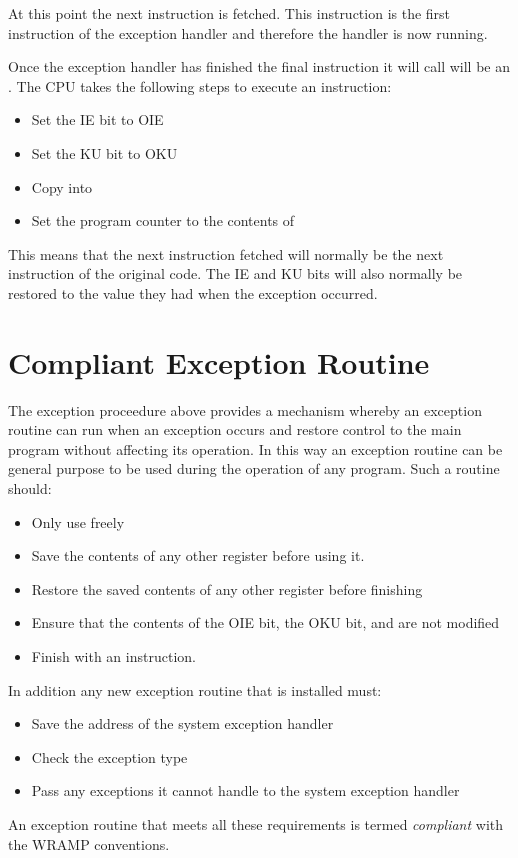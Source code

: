 At this point the next instruction is fetched. This instruction is the
first instruction of the exception handler and therefore the handler
is now running.

Once the exception handler has finished the final instruction it will
call will be an . The CPU takes the following steps to
execute an  instruction:

\begin{itemize}
\item Set the IE bit to OIE
\item Set the KU bit to OKU
\item Copy  into 
\item Set the program counter to the contents of 
\end{itemize}

This means that the next instruction fetched will normally be the
next instruction of the original code. The IE and KU bits will also
normally be restored to the value they had when the exception occurred.

\section{Compliant Exception Routine}

The exception proceedure above provides a mechanism whereby an exception routine
can run when an exception occurs and restore control to the main program without
affecting its operation.  In this way an exception routine can be general
purpose to be used during the operation of any program.  Such a routine should:

\begin{itemize}
\item Only use freely
\item Save the contents of any other register before using it.
\item Restore the saved contents of any other register before finishing
\item Ensure that the contents of the OIE bit, the OKU bit,  and
 are not modified
\item Finish with an   instruction.
\end{itemize}

In addition any new exception routine that is installed must:

\begin{itemize}
\item Save the address of the system exception handler
\item Check the exception type
\item Pass any exceptions it cannot handle to the system exception handler
\end{itemize}

An exception routine that meets all these requirements is termed {\em compliant}
with the WRAMP conventions.
